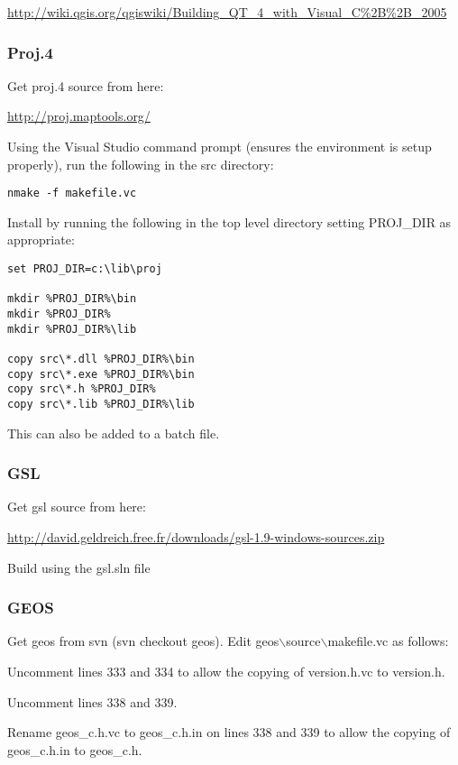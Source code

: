 \url{http://wiki.qgis.org/qgiswiki/Building\_QT\_4\_with\_Visual\_C\%2B\%2B\_2005}

\subsubsection{Proj.4}
Get proj.4 source from here:

\url{http://proj.maptools.org/}

Using the Visual Studio command prompt (ensures the environment is setup properly), run the following in the src directory:

\begin{verbatim}
nmake -f makefile.vc
\end{verbatim}

Install by running the following in the top level directory setting PROJ\_DIR as appropriate:

\begin{verbatim}
set PROJ_DIR=c:\lib\proj

mkdir %PROJ_DIR%\bin
mkdir %PROJ_DIR%
mkdir %PROJ_DIR%\lib

copy src\*.dll %PROJ_DIR%\bin
copy src\*.exe %PROJ_DIR%\bin
copy src\*.h %PROJ_DIR%
copy src\*.lib %PROJ_DIR%\lib 
\end{verbatim}

This can also be added to a batch file.

\subsubsection{GSL}
Get gsl source from here:

\url{http://david.geldreich.free.fr/downloads/gsl-1.9-windows-sources.zip}

Build using the gsl.sln file

\subsubsection{GEOS}
Get geos from svn (svn checkout  geos).
Edit geos$\backslash$source$\backslash$makefile.vc as follows:

Uncomment lines 333 and 334 to allow the copying of version.h.vc to version.h.

Uncomment lines 338 and 339.

Rename geos\_c.h.vc to geos\_c.h.in on lines 338 and 339 to allow the copying of geos\_c.h.in to geos\_c.h.

